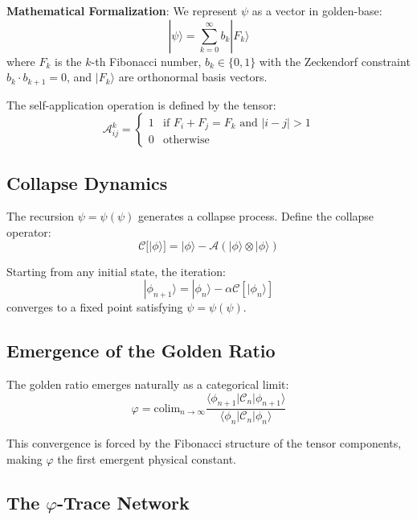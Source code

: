 \documentclass[%
 reprint,
 amsmath,amssymb,
 aps,
 prd,
 10pt,
 nofootinbib,      %
 longbibliography  %
]{revtex4-2}
\theoremstyle{definition}
\theoremstyle{remark}
\begin{document}
\textbf{Mathematical Formalization}: We represent $\psi$ as a vector in golden-base:
\begin{equation}
|\psi\rangle = \sum_{k=0}^{\infty} b_k |F_k\rangle
\end{equation}
where $F_k$ is the $k$-th Fibonacci number, $b_k \in \{0, 1\}$ with the Zeckendorf constraint $b_k \cdot b_{k+1} = 0$, and $|F_k\rangle$ are orthonormal basis vectors.

The self-application operation is defined by the tensor:
\begin{equation}
\mathcal{A}_{ij}^k = \begin{cases}
1 & \text{if } F_i + F_j = F_k \text{ and } |i-j| > 1 \\
0 & \text{otherwise}
\end{cases}
\end{equation}

\subsection{Collapse Dynamics}

The recursion $\psi = \psi(\psi)$ generates a collapse process. Define the collapse operator:
\begin{equation}
\mathcal{C}[|\phi\rangle] = |\phi\rangle - \mathcal{A}(|\phi\rangle \otimes |\phi\rangle)
\end{equation}

Starting from any initial state, the iteration:
\begin{equation}
|\phi_{n+1}\rangle = |\phi_n\rangle - \alpha \mathcal{C}[|\phi_n\rangle]
\end{equation}
converges to a fixed point satisfying $\psi = \psi(\psi)$.

\subsection{Emergence of the Golden Ratio}

The golden ratio emerges naturally as a categorical limit:
\begin{equation}
\varphi = \text{colim}_{n \to \infty} \frac{\langle\phi_{n+1}|\mathcal{C}_n|\phi_{n+1}\rangle}{\langle\phi_n|\mathcal{C}_n|\phi_n\rangle}
\end{equation}

This convergence is forced by the Fibonacci structure of the tensor components, making $\varphi$ the first emergent physical constant.

\subsection{The \texorpdfstring{$\varphi$}{phi}-Trace Network}
\end{document}

